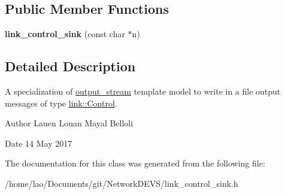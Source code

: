 \subsection*{Public Member Functions}
\begin{DoxyCompactItemize}
\item 
{\bfseries link\+\_\+control\+\_\+sink} (const char $\ast$n)\hypertarget{classlink__control__sink_aaacf4e3b053a0b5c905199aa377ae59d}{}\label{classlink__control__sink_aaacf4e3b053a0b5c905199aa377ae59d}

\end{DoxyCompactItemize}


\subsection{Detailed Description}
A specialization of \hyperlink{classoutput__stream}{output\+\_\+stream} template model to write in a file output messages of type \hyperlink{structlink_1_1Control}{link\+::\+Control}. 

\begin{DoxyAuthor}{Author}
Lauen Louan Mayal Belloli 
\end{DoxyAuthor}
\begin{DoxyDate}{Date}
14 May 2017 
\end{DoxyDate}


The documentation for this class was generated from the following file\+:\begin{DoxyCompactItemize}
\item 
/home/lao/\+Documents/git/\+Network\+D\+E\+V\+S/link\+\_\+control\+\_\+sink.\+h\end{DoxyCompactItemize}

